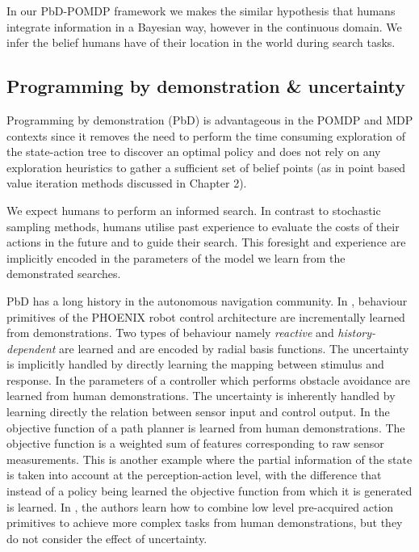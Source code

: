 In our PbD-POMDP framework we makes the similar hypothesis that humans integrate information in a Bayesian way, however in the 
continuous domain. We infer the belief humans have of their location in the world during search tasks.



\subsection{Programming by demonstration \& uncertainty}

Programming by demonstration (PbD) is advantageous in the POMDP and MDP contexts since it removes the need to perform the time 
consuming exploration of the state-action tree to discover an optimal policy and does not rely on any exploration 
heuristics to gather a sufficient set of belief points (as in point based value iteration methods discussed in Chapter 2).

We expect humans to perform an informed search. In contrast to stochastic sampling methods, 
humans utilise past experience to evaluate the costs of their actions in the future and to guide their search. This foresight and experience are implicitly encoded 
in the parameters of the model we learn from the demonstrated searches.

PbD has a long history in the autonomous navigation community. In \cite{Kasper2001153}, behaviour primitives of 
the PHOENIX robot control architecture are incrementally 
learned from demonstrations. Two types of behaviour namely \textit{reactive} and \textit{history-dependent} are 
learned and are encoded by radial basis functions. The
uncertainty is implicitly handled by directly learning the mapping between stimulus and response. In \cite{Hamner_2006_5810} the parameters of a
controller which performs obstacle avoidance are learned from human demonstrations. The uncertainty is inherently handled by learning directly the relation between sensor 
input and control output. In \cite{LfD_Autonomous_Navigation_in_Complex_Unstructured_Terrain} the objective function of a path planner is learned from human demonstrations. 
The objective function is a weighted sum of features corresponding to raw sensor measurements. This is another example where the partial information of the state is 
taken into account at the perception-action level, with the difference that instead of a policy being learned the objective function from which it is generated is learned. 
In \cite{Nicolescu01learningand}, the authors learn how to combine low level pre-acquired action 
primitives to achieve more complex tasks from human demonstrations, but 
they do not consider the effect of uncertainty.

